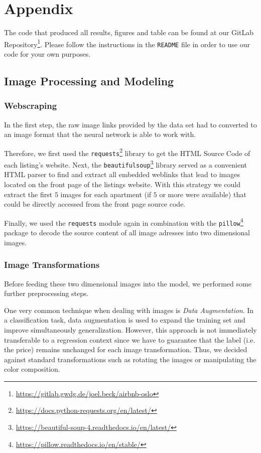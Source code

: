 \newpage
\appendix
\section{Appendix}

The code that produced all results, figures and table can be found at our GitLab Repository\footnote{\url{https://gitlab.gwdg.de/joel.beck/airbnb-oslo}}.
Please follow the instructions in the \texttt{README} file in order to use our code for your own purposes.

\subsection{Image Processing and Modeling} \label{appendix:images}

\subsubsection{Webscraping}

In the first step, the raw image links provided by the data set had to converted to an image format that the neural network is able to work with.

Therefore, we first used the \texttt{requests}\footnote{\url{https://docs.python-requests.org/en/latest/}} library to get the HTML Source Code of each listing's website.
Next, the \texttt{beautifulsoup}\footnote{\url{https://beautiful-soup-4.readthedocs.io/en/latest/}} library served as a convenient HTML parser to find and extract all embedded weblinks that lead to images located on the front page of the listings website.
With this strategy we could extract the first $5$ images for each apartment (if $5$ or more were available) that could be directly accessed from the front page source code.

Finally, we used the \texttt{requests} module again in combination with the \texttt{pillow}\footnote{\url{https://pillow.readthedocs.io/en/stable/}} package to decode the source content of all image adresses into two dimensional images.

\subsubsection{Image Transformations}

Before feeding these two dimensional images into the model, we performed some further preprocessing steps.

One very common technique when dealing with images is \emph{Data Augmentation}.
In a classification task, data augmentation is used to expand the training set and improve simultaneously generalization. However, this approach is not immediately transferable to a regression context since we have to guarantee that the label (i.e. the price) remains unchanged for each image transformation.
Thus, we decided against standard transformations such as rotating the images or manipulating the color composition.

